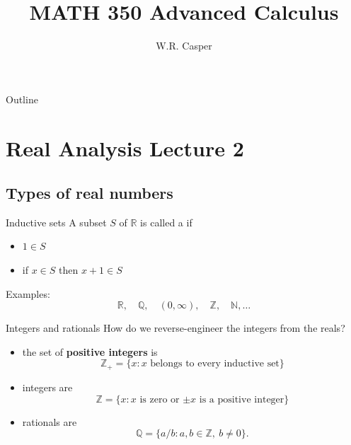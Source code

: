 \documentclass{beamer}
\title{MATH 350 Advanced Calculus}
\subtitle
{} %
\author[W.R. Casper] %
{W.R. Casper}
\institute[California State University Fullerton] %
{
  Department of Mathematics\\
  California State University Fullerton}
\begin{document}
\begin{frame}
  \titlepage
\end{frame}

\begin{frame}{Outline}
  \tableofcontents
\end{frame}



\section{Real Analysis Lecture 2}


\subsection{Types of real numbers}

\begin{frame}{Inductive sets}
A subset $S$ of $\mathbb{R}$ is called a  if
\begin{itemize}
\item $1\in S$
\item if $x\in S$ then $x+1\in S$ 
\end{itemize}
\pause
Examples:
$$\mathbb{R},\quad\mathbb{Q},\quad(0,\infty),\quad\mathbb{Z},\quad\mathbb{N},\dots$$
\end{frame}

\begin{frame}{Integers and rationals}
How do we reverse-engineer the integers from the reals?
\begin{itemize}
\pause
\item the set of \textbf{positive integers} is
$$\mathbb{Z}_+ = \{x: \text{$x$ belongs to every inductive set}\}$$
\pause
\item integers are
$$\mathbb{Z} = \{x: \text{$x$ is zero or $\pm x$ is a positive integer}\}$$
\pause
\item rationals are
$$\mathbb{Q} = \{a/b: a,b\in\mathbb{Z},\ b\neq 0\}.$$
\end{itemize}
\end{frame}
\end{document}
